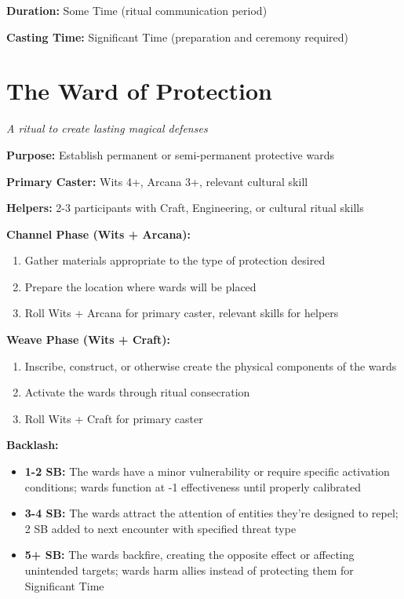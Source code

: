 \textbf{Duration:} Some Time (ritual communication period)

\textbf{Casting Time:} Significant Time (preparation and ceremony required)

\section*{The Ward of Protection}
\textit{A ritual to create lasting magical defenses}

\textbf{Purpose:} Establish permanent or semi-permanent protective wards

\textbf{Primary Caster:} Wits 4+, Arcana 3+, relevant cultural skill

\textbf{Helpers:} 2-3 participants with Craft, Engineering, or cultural ritual skills

\textbf{Channel Phase (Wits + Arcana):}
\begin{enumerate}
\item Gather materials appropriate to the type of protection desired
\item Prepare the location where wards will be placed
\item Roll Wits + Arcana for primary caster, relevant skills for helpers
\end{enumerate}

\textbf{Weave Phase (Wits + Craft):}
\begin{enumerate}
\item Inscribe, construct, or otherwise create the physical components of the wards
\item Activate the wards through ritual consecration
\item Roll Wits + Craft for primary caster
\end{enumerate}

\textbf{Backlash:}
\begin{itemize}
\item \textbf{1-2 SB:} The wards have a minor vulnerability or require specific activation conditions; wards function at -1 effectiveness until properly calibrated
\item \textbf{3-4 SB:} The wards attract the attention of entities they're designed to repel; 2 SB added to next encounter with specified threat type
\item \textbf{5+ SB:} The wards backfire, creating the opposite effect or affecting unintended targets; wards harm allies instead of protecting them for Significant Time
\end{itemize}

